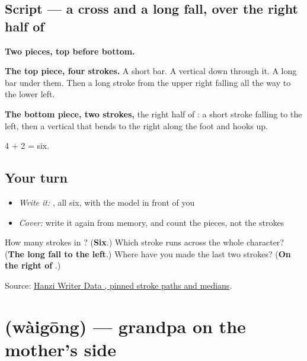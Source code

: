 \subsection*{Script — a cross and a long fall, over the right half of }

\begin{quote}
\end{quote}

\textbf{Two pieces, top before bottom.}

\textbf{The top piece, four strokes.} A short bar. A vertical down through it. A long bar under them. Then a long stroke from the upper right falling all the way to the lower left.

\textbf{The bottom piece, two strokes,} the right half of : a short stroke falling to the left, then a vertical that bends to the right along the foot and hooks up.

4 + 2 = six.

\subsection*{Your turn}
\begin{itemize}
\raggedright
  \item \emph{Write it:} , all six, with the model in front of you
  \item \emph{Cover:} write it again from memory, and count the pieces, not the strokes
\end{itemize}

\begin{tcolorbox}[breakable,colback=teal!4,colframe=teal!35!black,title={Before you move on}]
How many strokes in ? (\textbf{Six}.) Which stroke runs across the whole character? (\textbf{The long fall to the left}.) Where have you made the last two strokes? (\textbf{On the right of }.)

Source: \href{https://raw.githubusercontent.com/chanind/hanzi-writer-data/68d10a4b21150cae5e1ebbd223eed289cf32d90c/data/\%E8\%80\%81.json}{Hanzi Writer Data , pinned stroke paths and medians}.
\end{tcolorbox}
\section[\texorpdfstring{\zh{外公} (wàigōng)}{外公 (wàigōng)}]{ (wàigōng) — grandpa on the mother's side}

